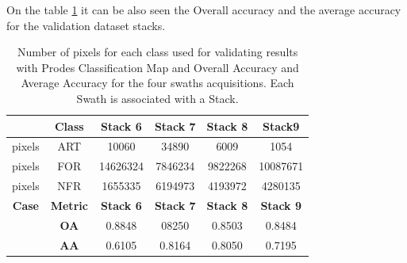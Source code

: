 On the table \ref{tab:class_accuracy_rondonia} it can be also seen the Overall accuracy and the average accuracy for the validation dataset stacks.

\begin{table}[H]
    \centering
    \begin{tabular}{c|c|c|c|c|c}
    \hline
         &\textbf{Class}&\textbf{Stack 6}&\textbf{Stack 7}& \textbf{Stack 8} & \textbf{Stack9}\\
         \hline
         pixels&ART&10060&34890&6009&1054\\
         pixels&FOR&14626324&7846234&9822268&10087671\\
         pixels&NFR&1655335&6194973&4193972&4280135\\
         \hline
         \textbf{Case}&\textbf{Metric}&\textbf{Stack 6}& \textbf{Stack 7} & \textbf{Stack 8} & \textbf{Stack 9} \\
         \hline
         &\textbf{OA}&0.8848&08250&0.8503&0.8484\\
         &\textbf{AA}&0.6105&0.8164&0.8050&0.7195\\
         \hline
    \end{tabular}
    \caption{Number of pixels for each class used for validating results with Prodes Classification Map and Overall Accuracy and Average Accuracy for the four swaths acquisitions. Each Swath is associated with a Stack.}
    \label{tab:class_accuracy_rondonia}
\end{table}